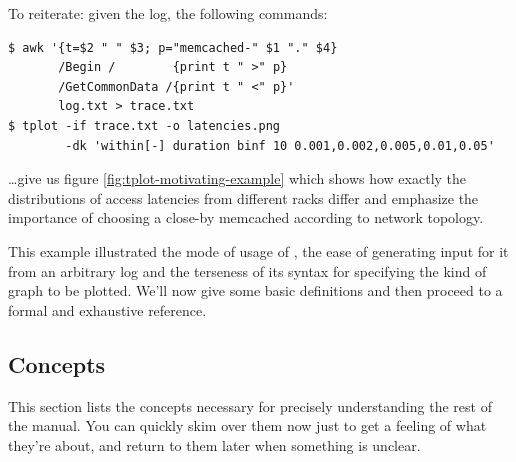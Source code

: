 \documentclass{article}
\begin{document}
To reiterate: given the log, the following commands:

\begin{verbatim}
$ awk '{t=$2 " " $3; p="memcached-" $1 "." $4}
       /Begin /        {print t " >" p} 
       /GetCommonData /{print t " <" p}'
       log.txt > trace.txt
$ tplot -if trace.txt -o latencies.png
        -dk 'within[-] duration binf 10 0.001,0.002,0.005,0.01,0.05'
\end{verbatim}

\ldots give us figure \ref{fig:tplot-motivating-example} which shows how exactly the distributions of access latencies from different racks differ and emphasize the importance of choosing a close-by memcached according to network topology.

This example illustrated the mode of usage of \timeplot{}, the ease of generating input for it from an arbitrary log and the terseness of its syntax for specifying the kind of graph to be plotted. We'll now give some basic definitions and then proceed to a formal and exhaustive reference.

\subsection{Concepts}
\label{sec:tplot-concepts}

This section lists the concepts necessary for precisely understanding the rest of the manual. You can quickly skim over them now just to get a feeling of what they're about, and return to them later when something is unclear.
\end{document}
